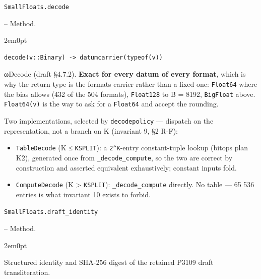\par\medskip\noindent\begin{minipage}{\linewidth}
\hypertarget{2086756398805737224}{\texttt{SmallFloats.decode}}  -- {Method.}
\nopagebreak
\begin{adjustwidth}{2em}{0pt}


\begin{verbatim}
decode(v::Binary) -> datumcarrier(typeof(v))
\end{verbatim}

ωDecode (draft §4.7.2). \textbf{Exact for every datum of every format}, which is why the return type is the format{\textquotesingle}s carrier rather than a fixed one: \texttt{Float64} where the bias allows (432 of the 504 formats), \texttt{Float128} to B = 8192, \texttt{BigFloat} above. \texttt{Float64(v)} is the way to ask for a \texttt{Float64} and accept the rounding.

Two implementations, selected by \texttt{decodepolicy} — dispatch on the representation, not a branch on K (invariant 9, §2 R-F):

\begin{itemize}
\item \texttt{TableDecode} (K ≤ \texttt{KSPLIT}): a \texttt{2{\textasciicircum}K}-entry constant-tuple lookup (bitops plan K2), generated once from \texttt{\_\allowbreak{}decode\_\allowbreak{}compute}, so the two are correct by construction and asserted equivalent exhaustively; constant inputs fold.


\item \texttt{ComputeDecode} (K > \texttt{KSPLIT}): \texttt{\_\allowbreak{}decode\_\allowbreak{}compute} directly. No table — 65 536 entries is what invariant 10 exists to forbid.

\end{itemize}


\end{adjustwidth}
\end{minipage}
\par\medskip

\par\medskip\noindent\begin{minipage}{\linewidth}
\hypertarget{1910472893916712872}{\texttt{SmallFloats.draft\_\allowbreak{}identity}}  -- {Method.}
\nopagebreak
\begin{adjustwidth}{2em}{0pt}

Structured identity and SHA-256 digest of the retained P3109 draft transliteration.



\end{adjustwidth}
\end{minipage}
\par\medskip

